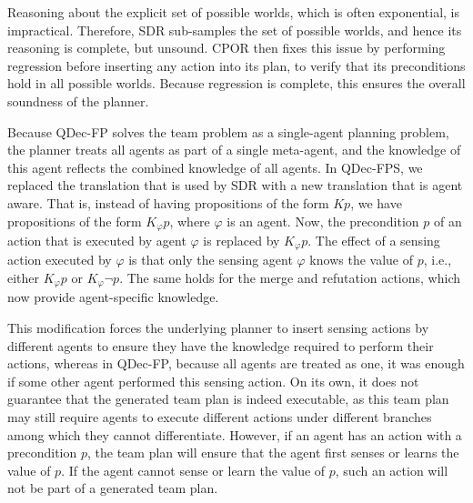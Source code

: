 \documentclass[letterpaper]{article} %
\theoremstyle{definition}
\begin{document}
{Reasoning about the explicit set of possible worlds, which is often exponential, is impractical. Therefore, SDR sub-samples the set of possible worlds, and hence its reasoning is complete, but unsound. CPOR then fixes
this issue by performing regression before inserting any action into its plan, to verify that its preconditions hold in all possible worlds. Because regression is complete, this ensures the overall soundness of the planner. 


Because QDec-FP solves the team problem as a single-agent planning problem, the planner treats all agents as part of a single meta-agent, and the knowledge of this agent reflects the combined knowledge of all agents. 
In QDec-FPS, we replaced the translation that is used by SDR with a new translation that is agent aware. That is, instead of having propositions of the form $Kp$, we have propositions of the form $K_{\varphi}p$, where $\varphi$ is an agent. Now, the precondition $p$ of an action that is executed by agent $\varphi$ is replaced by $K_{\varphi}p$. The effect of a sensing action executed by $\varphi$ is that only the sensing agent $\varphi$ knows the value of $p$, i.e., either $K_{\varphi}p$ or $K_{\varphi}\neg p$. 
The same holds for the merge and refutation actions, which now provide  agent-specific knowledge.

This modification forces the underlying planner to insert sensing actions by different agents to ensure they have the knowledge required to perform their actions, whereas in QDec-FP, because all agents are treated as one, it was enough if some other agent performed this sensing action.
On its own, it does not guarantee that the generated team plan is indeed executable, as this team plan may still require agents to execute different actions under different branches among which they cannot differentiate.
However, if an agent has an action with a precondition $p$, the team plan will ensure that the agent first senses or learns the value of $p$.
If the agent cannot sense or learn the value of $p$, such an action will not be part of a generated team plan.

}
\end{document}
